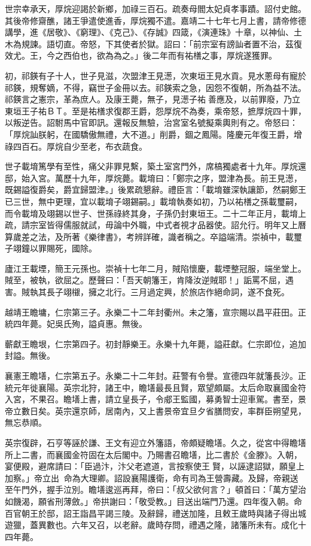 世宗幸承天，厚烷迎謁於新鄉，加祿三百石。疏奏母閻太妃貞孝事蹟。詔付史館。其後帝修齋醮，諸王爭遣使進香，厚烷獨不遣。嘉靖二十七年七月上書，請帝修德講學，進《居敬》、《窮理》、《克己》、《存誠》四箴，《演連珠》十章，以神仙、土木為規諫。語切直。帝怒，下其使者於獄。詔曰：「前宗室有謗訕者置不治，茲復效尤。王，今之西伯也，欲為為之。」後二年而有祐橏之事，厚烷遂獲罪。

初，祁鍈有子十人，世子見滋，次盟津王見濍，次東垣王見水貢。見水蔥母有寵於祁鍈，規奪嫡，不得，竊世子金冊以去。祁鍈索之急，因怨不復朝，所為益不法。祁鍈言之憲宗，革為庶人。及康王薨，無子，見濍子祐善應及，以前罪廢，乃立東垣王子祐ＢＴ。至是祐橏求復郡王爵，怨厚烷不為奏，乘帝怒，摭厚烷四十罪，以叛逆告。詔駙馬中官即訊。還報反無驗，治宮室名號擬乘輿則有之。帝怒曰：「厚烷訕朕躬，在國驕傲無禮，大不道。」削爵，錮之鳳陽。隆慶元年復王爵，增祿四百石。厚烷自少至老，布衣蔬食。

世子載堉篤學有至性，痛父非罪見繫，築土室宮門外，席槁獨處者十九年。厚烷還邸，始入宮。萬歷十九年，厚烷薨。載堉曰：「鄭宗之序，盟津為長。前王見濍，既錫謚復爵矣，爵宜歸盟津。」後累疏懇辭。禮臣言：「載堉雖深執讓節，然嗣鄭王已三世，無中更理，宜以載堉子翊錫嗣。」載堉執奏如初，乃以祐橏之孫載璽嗣，而令載堉及翊錫以世子、世孫祿終其身，子孫仍封東垣王。二十二年正月，載堉上疏，請宗室皆得儒服就試，毋論中外職，中式者視才品器使。詔允行。明年又上曆算歲差之法，及所著《樂律書》，考辨詳確，識者稱之。卒謚端清。崇禎中，載璽子翊鐘以罪賜死，國除。

廬江王載堙，簡王元孫也。崇禎十七年二月，賊陷懷慶，載堙整冠服，端坐堂上。賊至，被執，欲屈之。歷聲曰：「吾天朝籓王，肯降汝逆賊耶！」詬罵不屈，遇害。賊執其長子翊檭，擁之北行。三月過定興，於旅店作絕命詞，遂不食死。

越靖王瞻墉，仁宗第三子。永樂二十二年封衢州。未之籓，宣宗賜以昌平莊田。正統四年薨。妃吳氏殉，謚貞惠。無後。

蘄獻王瞻垠，仁宗第四子。初封靜樂王。永樂十九年薨，謚莊獻。仁宗即位，追加封謚。無後。

襄憲王瞻墡，仁宗第五子。永樂二十二年封。莊警有令譽。宣德四年就籓長沙。正統元年徙襄陽。英宗北狩，諸王中，瞻墡最長且賢，眾望頗屬。太后命取襄國金符入宮，不果召。瞻墡上書，請立皇長子，令郕王監國，募勇智士迎車駕。書至，景帝立數日矣。英宗還京師，居南內，又上書景帝宜旦夕省膳問安，率群臣朔望見，無忘恭順。

英宗復辟，石亨等誣於謙、王文有迎立外籓語，帝頗疑瞻墡。久之，從宮中得瞻墡所上二書，而襄國金符固在太后閣中。乃賜書召瞻墡，比二書於《金滕》。入朝，宴便殿，避席請曰：「臣過汴，汴父老遮道，言按察使王賢，以誣逮詔獄，願皇上加察。」帝立出，命為大理卿。詔設襄陽護衛，命有司為王營壽藏。及歸，帝親送至午門外，握手泣別。瞻墡逡巡再拜，帝曰：「叔父欲何言？」頓首曰：「萬方望治如饑渴，願省刑薄斂。」帝拱謝曰：「敬受教。」目送出端門乃還。四年復入朝。命百官朝王於邸，詔王詣昌平謁三陵。及辭歸，禮送加隆，且敕王歲時與諸子得出城遊獵，蓋異數也。六年又召，以老辭。歲時存問，禮遇之隆，諸籓所未有。成化十四年薨。

